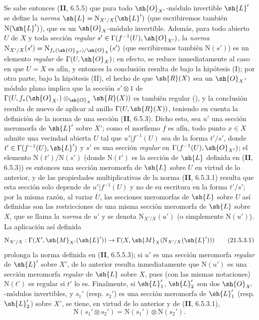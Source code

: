 \begin{env}[21.5.3]
Se sabe entonces (\textbf{II}, 6.5.5) que para todo $\sh{O}_{X'}$-módulo invertible $\sh{L}'$ se define la \emph{norma} $\sh{L}=\mathrm{N}_{X'/X}(\sh{L}')$ (que escribiremos también $\mathrm{N}(\sh{L}')$), que es un $\sh{O}_X$-módulo invertible.
Además, para todo abierto $U$ de $X$ y toda sección \emph{regular} $s'\in\Gamma(f^{-1}(U),\sh{O}_{X'})$, la \emph{norma} $\mathrm{N}_{X'/X}(s')=\mathrm{N}_{f_*(\sh{O}_{X'})/\sh{O}_X}(s')$ (que escribiremos también $\mathrm{N}(s')$) es un elemento \emph{regular} de $\Gamma(U,\sh{O}_X)$;
en efecto, se reduce inmediatamente al caso en que $U=X$ es afín, y entonces la conclusión resulta de  bajo la hipótesis (I);
por otra parte, bajo la hipótesis (II), el hecho de que $\sh{R}(X)$ sea un $\sh{O}_X$-módulo plano implica que la sección $s'\otimes1$ de $\Gamma(U,f_*(\sh{O}_{X'})\otimes_{\sh{O}_X}\sh{R}(X))$ es también regular (), y la conclusión resulta de nuevo de aplicar  al anillo $\Gamma(U,\sh{R}(X))$, teniendo en cuenta la definición de la norma de una sección (\textbf{II}, 6.5.3).
Dicho esto, sea $u'$ una sección meromorfa de $\sh{L}'$ sobre $X'$;
como el morfismo $f$ es afín, todo punto $x\in X$ admite una vecindad abierta $U$ tal que $u'|f^{-1}(U)$ sea de la forma $t'/s'$, donde $t'\in\Gamma(f^{-1}(U),\sh{L}')$ y $s'$ es una sección \emph{regular} en $\Gamma(f^{-1}(U),\sh{O}_{X'})$;
el elemento $\mathrm{N}(t')/\mathrm{N}(s')$ (donde $\mathrm{N}(t')$ es la sección de $\sh{L}$ definida en (\textbf{II}, 6.5.3)) es entonces una sección meromorfa de $\sh{L}$ sobre $U$ en virtud de lo anterior, y de las propiedades multiplicativas de la norma (\textbf{II}, 6.5.3.1) resulta que esta sección solo depende de $u'|f^{-1}(U)$ y no de su escritura en la forma $t'/s'$;
por la misma razón, al variar $U$, las secciones meromorfas de $\sh{L}$ sobre $U$ así definidas son las restricciones de una misma sección meromorfa de $\sh{L}$ sobre $X$, que se llama la \emph{norma} de $u'$ y se denota $\mathrm{N}_{X'/X}(u')$ (o simplemente $\mathrm{N}(u')$).
La aplicación así definida
\[
\label{IV.21.5.3.1}
  \mathrm{N}_{X'/X}:\Gamma(X',\sh{M}_{X'}(\sh{L}'))\to\Gamma(X,\sh{M}_X(\mathrm{N}_{X'/X}(\sh{L}')))
  \tag{21.5.3.1}
\]
prolonga la norma definida en (\textbf{II}, 6.5.5.3);
si $u'$ es una sección meromorfa \emph{regular} de $\sh{L}'$ sobre $X'$, de lo anterior resulta inmediatamente que $\mathrm{N}(u')$ es una sección meromorfa \emph{regular} de $\sh{L}$ sobre $X$, pues (con las mismas notaciones) $\mathrm{N}(t')$ es regular si $t'$ lo es.
Finalmente, si $\sh{L}_1'$, $\sh{L}_2'$ son dos $\sh{O}_{X'}$-módulos invertibles, y $s_1'$ (resp. $s_2'$) es una sección meromorfa de $\sh{L}_1'$ (resp. $\sh{L}_2'$) sobre $X'$, se tiene, en virtud de lo anterior y de (\textbf{II}, 6.5.3.1),
\[
\label{IV.21.5.3.2}
  \mathrm{N}(s_1'\otimes s_2')=\mathrm{N}(s_1')\otimes\mathrm{N}(s_2').
  \tag{21.5.3.2}
\]
\end{env}

